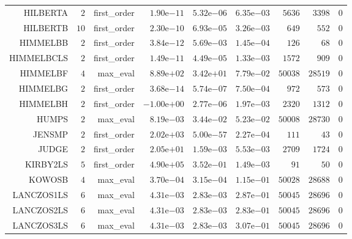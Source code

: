 \begin{longtable}{rrrrrrrrr}
HILBERTA & \(     2\) & first\_order & \( 1.90\)e\(-11\) & \( 5.32\)e\(-06\) & \( 6.35\)e\(-03\) & \(  5636\) & \(  3398\) & \(     0\) \\
HILBERTB & \(    10\) & first\_order & \( 2.30\)e\(-10\) & \( 6.93\)e\(-05\) & \( 3.26\)e\(-03\) & \(   649\) & \(   552\) & \(     0\) \\
HIMMELBB & \(     2\) & first\_order & \( 3.84\)e\(-12\) & \( 5.69\)e\(-03\) & \( 1.45\)e\(-04\) & \(   126\) & \(    68\) & \(     0\) \\
HIMMELBCLS & \(     2\) & first\_order & \( 1.49\)e\(-11\) & \( 4.49\)e\(-05\) & \( 1.33\)e\(-03\) & \(  1572\) & \(   909\) & \(     0\) \\
HIMMELBF & \(     4\) & max\_eval & \( 8.89\)e\(+02\) & \( 3.42\)e\(+01\) & \( 7.79\)e\(-02\) & \( 50038\) & \( 28519\) & \(     0\) \\
HIMMELBG & \(     2\) & first\_order & \( 3.68\)e\(-14\) & \( 5.74\)e\(-07\) & \( 7.50\)e\(-04\) & \(   972\) & \(   573\) & \(     0\) \\
HIMMELBH & \(     2\) & first\_order & \(-1.00\)e\(+00\) & \( 2.77\)e\(-06\) & \( 1.97\)e\(-03\) & \(  2320\) & \(  1312\) & \(     0\) \\
HUMPS & \(     2\) & max\_eval & \( 8.19\)e\(-03\) & \( 3.44\)e\(-02\) & \( 5.23\)e\(-02\) & \( 50008\) & \( 28730\) & \(     0\) \\
JENSMP & \(     2\) & first\_order & \( 2.02\)e\(+03\) & \( 5.00\)e\(-57\) & \( 2.27\)e\(-04\) & \(   111\) & \(    43\) & \(     0\) \\
JUDGE & \(     2\) & first\_order & \( 2.05\)e\(+01\) & \( 1.59\)e\(-03\) & \( 5.53\)e\(-03\) & \(  2709\) & \(  1724\) & \(     0\) \\
KIRBY2LS & \(     5\) & first\_order & \( 4.90\)e\(+05\) & \( 3.52\)e\(-01\) & \( 1.49\)e\(-03\) & \(    91\) & \(    50\) & \(     0\) \\
KOWOSB & \(     4\) & max\_eval & \( 3.70\)e\(-04\) & \( 3.15\)e\(-04\) & \( 1.15\)e\(-01\) & \( 50028\) & \( 28688\) & \(     0\) \\
LANCZOS1LS & \(     6\) & max\_eval & \( 4.31\)e\(-03\) & \( 2.83\)e\(-03\) & \( 2.87\)e\(-01\) & \( 50045\) & \( 28696\) & \(     0\) \\
LANCZOS2LS & \(     6\) & max\_eval & \( 4.31\)e\(-03\) & \( 2.83\)e\(-03\) & \( 2.83\)e\(-01\) & \( 50045\) & \( 28696\) & \(     0\) \\
LANCZOS3LS & \(     6\) & max\_eval & \( 4.31\)e\(-03\) & \( 2.83\)e\(-03\) & \( 3.07\)e\(-01\) & \( 50045\) & \( 28696\) & \(     0\) \\

\end{longtable}
